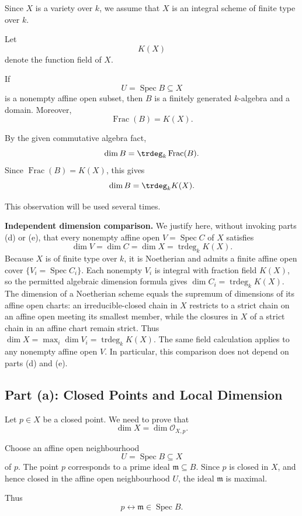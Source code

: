 Since \(X\) is a variety over \(k\), we assume that \(X\) is an integral scheme of finite type over \(k\).

Let
\[
K(X)
\]
denote the function field of \(X\).

If
\[
U=\operatorname{Spec} B\subseteq X
\]
is a nonempty affine open subset, then \(B\) is a finitely generated \(k\)-algebra and a domain. Moreover,
\[
\operatorname{Frac}(B)=K(X).
\]

By the given commutative algebra fact,
\[
\dim B=\trdeg_k \operatorname{Frac}(B).
\]
Since \(\operatorname{Frac}(B)=K(X)\), this gives
\[
\dim B=\trdeg_k K(X).
\]

This observation will be used several times.

\medskip
\noindent\textbf{Independent dimension comparison.}
We justify here, without invoking parts (d) or (e), that every nonempty affine
open $V=\operatorname{Spec} C$ of $X$ satisfies
\[
\dim V=\dim C=\dim X=\operatorname{trdeg}_k K(X).
\]
Because $X$ is of finite type over $k$, it is Noetherian and admits a
finite affine open cover $\{V_i=\operatorname{Spec} C_i\}$. Each nonempty
$V_i$ is integral with fraction field $K(X)$, so the permitted algebraic
dimension formula gives
$\dim C_i=\operatorname{trdeg}_k K(X)$.
The dimension of a Noetherian scheme equals the supremum of dimensions
of its affine open charts: an irreducible-closed chain in $X$ restricts
to a strict chain on an affine open meeting its smallest member, while
the closures in $X$ of a strict chain in an affine chart remain strict.
Thus $\dim X=\max_i\dim V_i=\operatorname{trdeg}_k K(X)$.
The same field calculation applies to any nonempty affine open $V$.
In particular, this comparison does not depend on parts (d) and (e).

\subsection{Part (a): Closed Points and Local Dimension}

Let \(p\in X\) be a closed point. We need to prove that
\[
\dim X=\dim \mathcal O_{X,p}.
\]

Choose an affine open neighbourhood
\[
U=\operatorname{Spec} B\subseteq X
\]
of \(p\). The point \(p\) corresponds to a prime ideal \(\mathfrak m\subseteq B\). Since \(p\) is closed in \(X\), and hence closed in the affine open neighbourhood \(U\), the ideal \(\mathfrak m\) is maximal.

Thus
\[
p\leftrightarrow \mathfrak m\in \operatorname{Spec} B.
\]

